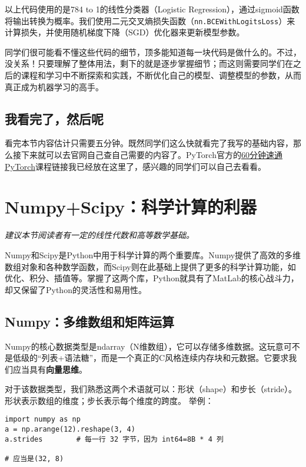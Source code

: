 \documentclass[../main.tex]{subfiles}
\begin{document}
以上代码使用的是784 to 1的线性分类器（Logistic Regression），通过sigmoid函数将输出转换为概率。我们使用二元交叉熵损失函数（\texttt{nn.BCEWithLogitsLoss}）来计算损失，并使用随机梯度下降（SGD）优化器来更新模型参数。

同学们很可能看不懂这些代码的细节，顶多能知道每一块代码是做什么的。不过，没关系！只要理解了整体用法，剩下的就是逐步掌握细节；而这则需要同学们在之后的课程和学习中不断探索和实践，不断优化自己的模型、调整模型的参数，从而真正成为机器学习的高手。

\subsection{我看完了，然后呢}

看完本节内容估计只需要五分钟。既然同学们这么快就看完了我写的基础内容，那么接下来就可以去官网自己查自己需要的内容了。PyTorch官方的\href{https://docs.pytorch.org/tutorials/beginner/deep_learning_60min_blitz.html}{60分钟速通PyTorch}课程链接我已经放在这里了，感兴趣的同学们可以自己去看看。

\section{Numpy+Scipy：科学计算的利器}

\begin{flushright}
  \emph{建议本节阅读者有一定的线性代数和高等数学基础。}
\end{flushright}

Numpy和Scipy是Python中用于科学计算的两个重要库。Numpy提供了高效的多维数组对象和各种数学函数，而Scipy则在此基础上提供了更多的科学计算功能，如优化、积分、插值等。掌握了这两个库，Python就具有了MatLab的核心战斗力，却又保留了Python的灵活性和易用性。

\subsection{Numpy：多维数组和矩阵运算}

Numpy的核心数据类型是ndarray（N维数组），它可以存储多维数据。这玩意可不是低级的“列表+语法糖”，而是一个真正的C风格连续内存块和元数据。它要求我们应当具有\textbf{向量思维}。

对于该数据类型，我们熟悉这两个术语就可以：形状（shape）和步长（stride）。形状表示数组的维度；步长表示每个维度的跨度。
举例：
\begin{lstlisting}
import numpy as np
a = np.arange(12).reshape(3, 4)
a.strides        # 每一行 32 字节，因为 int64=8B * 4 列

# 应当是(32, 8)
\end{lstlisting}
\end{document}
